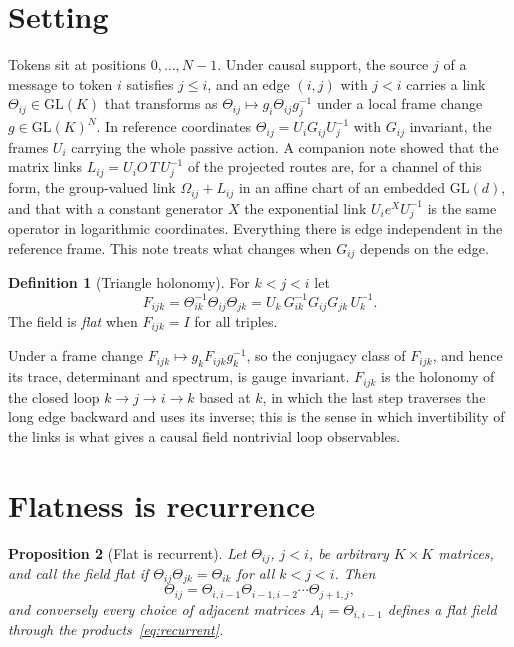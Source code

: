 \documentclass[11pt]{article}
\newtheorem{proposition}{Proposition}
\theoremstyle{definition}
\newtheorem{definition}[proposition]{Definition}
\theoremstyle{remark}
\newcommand{\GL}{\mathrm{GL}}
\begin{document}
\section{Setting}
\label{sec:setting}

Tokens sit at positions $0,\dots,N-1$. Under causal support, the source $j$ of a message to token $i$ satisfies $j\le i$, and an edge $(i,j)$ with $j<i$ carries a link $\Theta_{ij}\in\GL(K)$ that transforms as $\Theta_{ij}\mapsto g_i\Theta_{ij}g_j^{-1}$ under a local frame change $g\in\GL(K)^N$. In reference coordinates $\Theta_{ij}=U_iG_{ij}U_j^{-1}$ with $G_{ij}$ invariant, the frames $U_i$ carrying the whole passive action. A companion note \cite{dennis2026linkorigin} showed that the matrix links $L_{ij}=U_iO\,T\,U_j^{-1}$ of the projected routes are, for a channel of this form, the group-valued link $\Omega_{ij}+L_{ij}$ in an affine chart of an embedded $\GL(d)$, and that with a constant generator $X$ the exponential link $U_ie^{X}U_j^{-1}$ is the same operator in logarithmic coordinates. Everything there is edge independent in the reference frame. This note treats what changes when $G_{ij}$ depends on the edge.

\begin{definition}[Triangle holonomy]
For $k<j<i$ let
\begin{equation}
F_{ijk}=\Theta_{ik}^{-1}\Theta_{ij}\Theta_{jk}=U_k\,G_{ik}^{-1}G_{ij}G_{jk}\,U_k^{-1}.
\label{eq:holonomy}
\end{equation}
The field is \emph{flat} when $F_{ijk}=I$ for all triples.
\end{definition}

Under a frame change $F_{ijk}\mapsto g_kF_{ijk}g_k^{-1}$, so the conjugacy class of $F_{ijk}$, and hence its trace, determinant and spectrum, is gauge invariant. $F_{ijk}$ is the holonomy of the closed loop $k\to j\to i\to k$ based at $k$, in which the last step traverses the long edge backward and uses its inverse; this is the sense in which invertibility of the links is what gives a causal field nontrivial loop observables.

\section{Flatness is recurrence}
\label{sec:flat}

\begin{proposition}[Flat is recurrent]
\label{prop:recurrent}
Let $\Theta_{ij}$, $j<i$, be arbitrary $K\times K$ matrices, and call the field flat if $\Theta_{ij}\Theta_{jk}=\Theta_{ik}$ for all $k<j<i$. Then
\begin{equation}
\Theta_{ij}=\Theta_{i,i-1}\Theta_{i-1,i-2}\cdots\Theta_{j+1,j},
\label{eq:recurrent}
\end{equation}
and conversely every choice of adjacent matrices $A_i=\Theta_{i,i-1}$ defines a flat field through the products~\eqref{eq:recurrent}.
\end{proposition}
\end{document}

